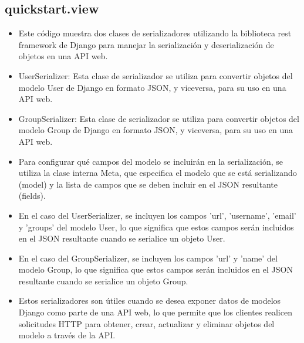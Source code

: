 \documentclass{article}
\begin{document}
\subsection{quickstart.view}
\begin{itemize}	
	\item Este código muestra dos clases de serializadores utilizando la biblioteca rest framework de Django para manejar la serialización y deserialización de objetos en una API web.
	\item UserSerializer: Esta clase de serializador se utiliza para convertir objetos del modelo User de Django en formato JSON, y viceversa, para su uso en una API web.

\item GroupSerializer: Esta clase de serializador se utiliza para convertir objetos del modelo Group de Django en formato JSON, y viceversa, para su uso en una API web.

\item Para configurar qué campos del modelo se incluirán en la serialización, se utiliza la clase interna Meta, que especifica el modelo que se está serializando (model) y la lista de campos que se deben incluir en el JSON resultante (fields).

\item En el caso del UserSerializer, se incluyen los campos 'url', 'username', 'email' y 'groups' del modelo User, lo que significa que estos campos serán incluidos en el JSON resultante cuando se serialice un objeto User.

\item En el caso del GroupSerializer, se incluyen los campos 'url' y 'name' del modelo Group, lo que significa que estos campos serán incluidos en el JSON resultante cuando se serialice un objeto Group.

\item Estos serializadores son útiles cuando se desea exponer datos de modelos Django como parte de una API web, lo que permite que los clientes realicen solicitudes HTTP para obtener, crear, actualizar y eliminar objetos del modelo a través de la API.

\end{itemize}	
	
\end{document}

